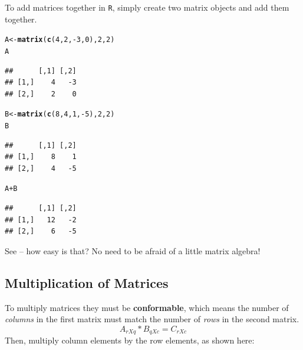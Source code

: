 \documentclass[11pt,openany]{book}\usepackage[]{graphicx}\usepackage[]{color}
\makeatletter
\newcommand{\hlnum}[1]{\textcolor[rgb]{0.686,0.059,0.569}{#1}}%
\newcommand{\hlopt}[1]{\textcolor[rgb]{0,0,0}{#1}}%
\newcommand{\hlstd}[1]{\textcolor[rgb]{0.345,0.345,0.345}{#1}}%
\newcommand{\hlkwb}[1]{\textcolor[rgb]{0.69,0.353,0.396}{#1}}%
\newcommand{\hlkwd}[1]{\textcolor[rgb]{0.737,0.353,0.396}{\textbf{#1}}}%
\newenvironment{kframe}{%
 \def\at@end@of@kframe{}%
 \ifinner\ifhmode%
  \def\at@end@of@kframe{\end{minipage}}%
  \begin{minipage}{\columnwidth}%
 \fi\fi%
 \def\FrameCommand##1{\hskip\@totalleftmargin \hskip-\fboxsep
 \colorbox{shadecolor}{##1}\hskip-\fboxsep
     \hskip-\linewidth \hskip-\@totalleftmargin \hskip\columnwidth}%
 \MakeFramed {\advance\hsize-\width
   \@totalleftmargin\z@ \linewidth\hsize
   \@setminipage}}%
 {\par\unskip\endMakeFramed%
 \at@end@of@kframe}
\newenvironment{knitrout}{}{} %
\renewenvironment{knitrout}{\begin{singlespace}}{\end{singlespace}} %
\makeatother
\begin{document}
\noindent 
To add matrices together in \texttt{R}, simply create two matrix objects and add them together. 
\begin{knitrout}
\color{fgcolor}\begin{kframe}
\begin{alltt}
\hlstd{A} \hlkwb{<-} \hlkwd{matrix}\hlstd{(}\hlkwd{c}\hlstd{(}\hlnum{4}\hlstd{,} \hlnum{2}\hlstd{,} \hlopt{-}\hlnum{3}\hlstd{,} \hlnum{0}\hlstd{),} \hlnum{2}\hlstd{,} \hlnum{2}\hlstd{)}
\hlstd{A}
\end{alltt}
\begin{verbatim}
##      [,1] [,2]
## [1,]    4   -3
## [2,]    2    0
\end{verbatim}
\begin{alltt}
\hlstd{B} \hlkwb{<-} \hlkwd{matrix}\hlstd{(}\hlkwd{c}\hlstd{(}\hlnum{8}\hlstd{,} \hlnum{4}\hlstd{,} \hlnum{1}\hlstd{,} \hlopt{-}\hlnum{5}\hlstd{),} \hlnum{2}\hlstd{,} \hlnum{2}\hlstd{)}
\hlstd{B}
\end{alltt}
\begin{verbatim}
##      [,1] [,2]
## [1,]    8    1
## [2,]    4   -5
\end{verbatim}
\begin{alltt}
\hlstd{A} \hlopt{+} \hlstd{B}
\end{alltt}
\begin{verbatim}
##      [,1] [,2]
## [1,]   12   -2
## [2,]    6   -5
\end{verbatim}
\end{kframe}
\end{knitrout}

\noindent 
See -- how easy is that? No need to be afraid of a little matrix algebra!

\subsection{Multiplication of Matrices}

To multiply matrices they must be \textbf{conformable}, which means the number of \textit{columns} in the first matrix must 
match the number of \textit{rows} in the second matrix. 
\begin{equation*}
A_{rXq} * B_{qXc} = C_{rXc}
\end{equation*}
Then, multiply column elements by the row elements, as shown here: 
\end{document}

